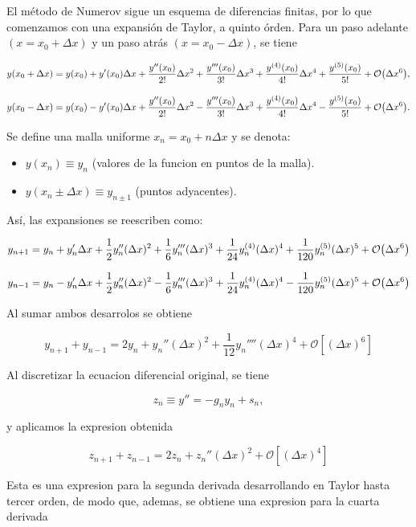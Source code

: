 \documentclass[11pt]{article}
\begin{document}
El método de Numerov sigue un esquema de diferencias finitas, por lo que comenzamos con una expansión de Taylor, a quinto órden. Para un paso adelante \((x= x_{0} + \Delta x)\) y un paso atrás \((x=x_{0} - \Delta x)\), se tiene

\[ y(x_{0} + \Delta x ) = y(x_{0}) + y'(x_{0})\Delta x + \frac{y''(x_{0})}{2!} \Delta x^2 + \frac{y'''(x_{0})}{3!}\Delta x^3 + \frac{y^{(4)}(x_{0})}{4!}\Delta x^4 + \frac{y^{(5)}(x_0)}{5!} + \order{\Delta x^6}, \]

\[ y(x_{0} - \Delta x ) = y(x_{0}) - y'(x_{0})\Delta x + \frac{y''(x_{0})}{2!} \Delta x^2 - \frac{y'''(x_{0})}{3!}\Delta x^3 + \frac{y^{(4)}(x_{0})}{4!}\Delta x^4 - \frac{y^{(5)}(x_0)}{5!} + \order{\Delta x^6}. \]

Se define una malla uniforme \(x_n = x_0 + n\Delta x\) y se denota:

\begin{itemize}
\item \(y(x_n) \equiv y_n\) (valores de la funcion en puntos de la malla).
\item \(y(x_n \pm \Delta x) \equiv y_{n \pm 1}\) (puntos adyacentes).
\end{itemize}

Así, las expansiones se reescriben como:

\[ y_{n+1} = y_n + y_n' \Delta x + \frac{1}{2} y_n'' (\Delta x)^2 + \frac{1}{6} y_n''' (\Delta x)^3 + \frac{1}{24} y_n^{(4)} (\Delta x)^4 + \frac{1}{120} y_n^{(5)} (\Delta x)^5 + \order{\Delta x^6} \]

\[ y_{n-1} = y_n - y_n' \Delta x + \frac{1}{2} y_n'' (\Delta x)^2 - \frac{1}{6} y_n''' (\Delta x)^3 + \frac{1}{24} y_n^{(4)} (\Delta x)^4 - \frac{1}{120} y_n^{(5)} (\Delta x)^5 + \order{\Delta x^6} \]


Al sumar ambos desarrolos se obtiene

\[ y_{n+1} + y_{n-1} = 2y_n + y_n''(\Delta x)^2 + \frac{1}{12} y_n'''' (\Delta x)^4 + \mathcal{O} [(\Delta x)^6] \]

Al discretizar la ecuacion diferencial original, se tiene

\[ z_n \equiv y'' = - g_ny_n + s_n, \]

y aplicamos la expresion obtenida

\[ z_{n+1} + z_{n-1} = 2z_n + z_n'' (\Delta x)^2 + \mathcal{O}[(\Delta x)^4] \]

Esta es una expresion para la segunda derivada desarrollando en Taylor hasta tercer orden, de modo que, ademas, se obtiene una expresion para la cuarta derivada
\end{document}
